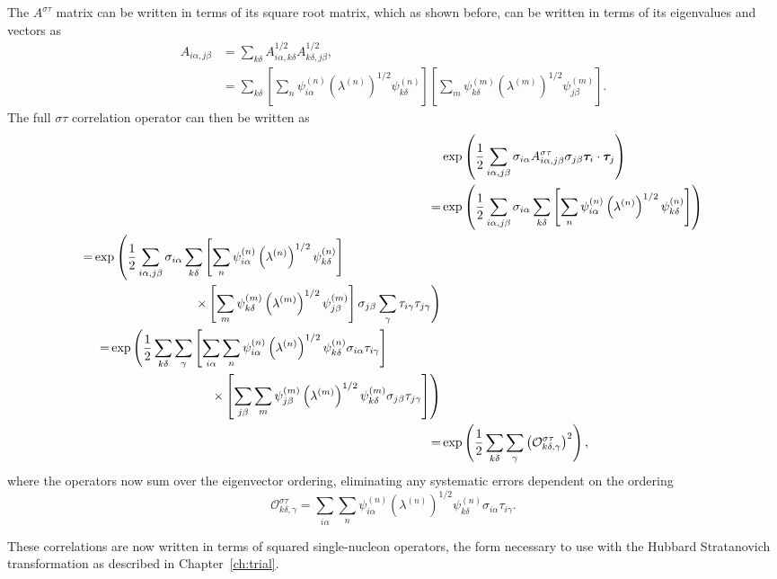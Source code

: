 The $A^{\sigma\tau}$ matrix can be written in terms of its square root matrix, which as shown before, can be written in terms of its eigenvalues and vectors as
\begin{align}
   A_{i\alpha,j\beta} &= \sum\limits_{k\delta} A^{1/2}_{i\alpha,k\delta}A^{1/2}_{k\delta,j\beta}, \\
      &= \sum\limits_{k\delta} \left[\sum\limits_n \psi_{i\alpha}^{(n)}\left(\lambda^{(n)}\right)^{1/2}\psi_{k\delta}^{(n)}\right] \left[\sum\limits_m \psi_{k\delta}^{(m)}\left(\lambda^{(m)}\right)^{1/2}\psi_{j\beta}^{(m)}\right].
\end{align}
The full $\sigma\tau$ correlation operator can then be written as
\begin{align}
   &\exp\left(\frac{1}{2}\sum\limits_{i\alpha,j\beta} \sigma_{i\alpha}A^{\sigma\tau}_{i\alpha,j\beta}\sigma_{j\beta}\bm{\tau}_i\cdot\bm{\tau}_j\right) \\
   =&\exp\left(\frac{1}{2}\sum\limits_{i\alpha,j\beta} \sigma_{i\alpha} \sum\limits_{k\delta} \left[\sum\limits_n \psi_{i\alpha}^{(n)}\left(\lambda^{(n)}\right)^{1/2}\psi_{k\delta}^{(n)}\right]\right) \\
   \begin{split}
      =&\exp\left(\frac{1}{2}\sum\limits_{i\alpha,j\beta} \sigma_{i\alpha} \sum\limits_{k\delta} \left[\sum\limits_n \psi_{i\alpha}^{(n)}\left(\lambda^{(n)}\right)^{1/2}\psi_{k\delta}^{(n)}\right]\right. \\
      &\qquad\qquad\qquad\qquad\left.\times\left[\sum\limits_m \psi_{k\delta}^{(m)}\left(\lambda^{(m)}\right)^{1/2}\psi_{j\beta}^{(m)}\right] \sigma_{j\beta}\sum\limits_\gamma\tau_{i\gamma}\tau_{j\gamma}\right)
   \end{split} \\
   \begin{split}
      =&\exp\left(\frac{1}{2}\sum\limits_{k\delta}\sum\limits_\gamma \left[\sum\limits_{i\alpha}\sum\limits_n \psi_{i\alpha}^{(n)}\left(\lambda^{(n)}\right)^{1/2}\psi_{k\delta}^{(n)}\sigma_{i\alpha}\tau_{i\gamma}\right]\right. \\
      &\qquad\qquad\qquad\qquad\left.\times\left[\sum\limits_{j\beta}\sum\limits_m \psi_{j\beta}^{(m)}\left(\lambda^{(m)}\right)^{1/2}\psi_{k\delta}^{(m)}\sigma_{j\beta}\tau_{j\gamma}\right] \right)
   \end{split} \\
   =&\exp\left(\frac{1}{2}\sum\limits_{k\delta}\sum\limits_\gamma\left(\mathcal{O}^{\sigma\tau}_{k\delta,\gamma}\right)^2 \right),
\end{align}
where the operators now sum over the eigenvector ordering, eliminating any systematic errors dependent on the ordering
\begin{equation}
   \mathcal{O}^{\sigma\tau}_{k\delta,\gamma} = \sum\limits_{i\alpha}\sum\limits_n \psi_{i\alpha}^{(n)}\left(\lambda^{(n)}\right)^{1/2}\psi_{k\delta}^{(n)}\sigma_{i\alpha}\tau_{i\gamma}.
\end{equation}

These correlations are now written in terms of squared single-nucleon operators, the form necessary to use with the Hubbard Stratanovich transformation as described in Chapter~\ref{ch:trial}.
